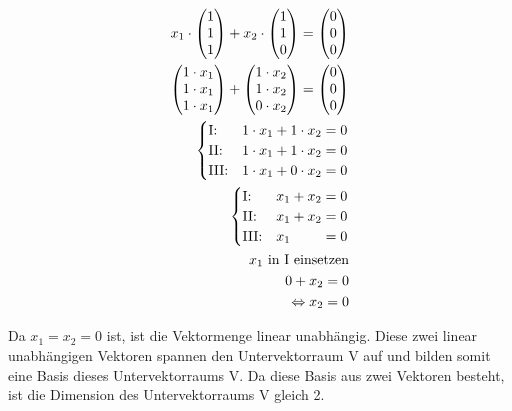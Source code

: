 \begin{align*}
    x_1 \cdot \begin{pmatrix}
                  1 \\ 1 \\1
              \end{pmatrix} + x_2 \cdot \begin{pmatrix}
                                            1 \\ 1 \\ 0
                                        \end{pmatrix} = \begin{pmatrix}
                                                            0 \\ 0 \\ 0
                                                        \end{pmatrix}             \\
    \begin{pmatrix}
        1 \cdot x_1 \\ 1 \cdot x_1 \\1 \cdot x_1
    \end{pmatrix} + \begin{pmatrix}
                        1 \cdot x_2 \\ 1 \cdot x_2 \\ 0 \cdot x_2
                    \end{pmatrix} = \begin{pmatrix}
                                        0 \\ 0 \\ 0
                                    \end{pmatrix}                       \\
    \begin{cases}
        \text{I:\@}   & 1 \cdot x_1 + 1 \cdot x_2 = 0 \\
        \text{II:\@}  & 1 \cdot x_1 + 1 \cdot x_2 = 0 \\
        \text{III:\@} & 1 \cdot x_1 + 0 \cdot x_2 = 0
    \end{cases}                                  \\
    \begin{cases}
        \text{I:\@}   & x_1 + x_2 = 0              \\
        \text{II:\@}  & x_1 + x_2 = 0              \\
        \text{III:\@} & x_1 \phantom{{} + x_2} = 0
    \end{cases} \\
    x_1 \text{ in I einsetzen}                                                     \\
    0 + x_2 = 0                                                                    \\
    \Leftrightarrow x_2 = 0
\end{align*}

Da $x_1 = x_2 = 0$ ist, ist die Vektormenge linear unabhängig. Diese zwei
linear unabhängigen Vektoren spannen den Untervektorraum V auf und bilden somit
eine Basis dieses Untervektorraums V. Da diese Basis aus zwei Vektoren besteht,
ist die Dimension des Untervektorraums V gleich 2.